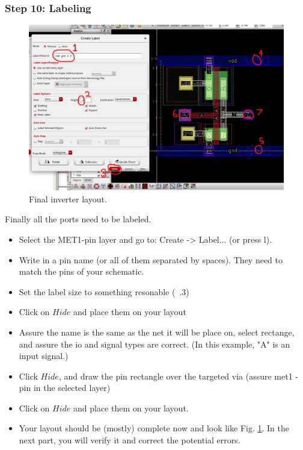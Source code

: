 \subsubsection*{Step 10: Labeling}

\parbox[t]{\dimexpr\textwidth-\leftmargin}{%
	\begin{figure}
		\vspace{-0mm}
		\centering
		\vspace{-\baselineskip}
		\includegraphics[scale=0.33]{figures/lab2/10}
		\caption{Final inverter layout.}
		\label{final_layout}
	\end{figure}
	Finally all the ports need to be labeled.
	\begin{itemize}
		\item Select the MET1-pin layer and go to: Create -> Label... (or press l).
		\item Write in a pin name (or all of them separated by spaces). They need to match the pins of your schematic.
		\item Set the label size to something resonable (~.3)
		\item Click on $Hide$ and place them on your layout
		\item Assure the name is the same as the net it will be place on, select rectange, and assure the io and signal types are correct. (In this example, "A" is an input signal.)
		\item Click $Hide$, and draw the pin rectangle over the targeted via (assure met1 - pin in the selected layer)
		\item Click on $Hide$ and place them on your layout.
		\item Your layout should be (mostly) complete now and look like Fig. \ref{final_layout}. In the next part, you will verify it and correct the potential errors.\end{itemize}
}

